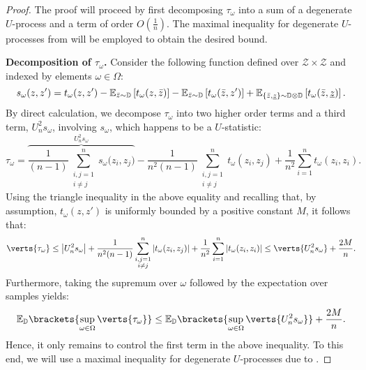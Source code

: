 \begin{proof}
The proof will proceed by first decomposing $\tau_{\omega}$ into  a sum of a degenerate $U$-process and a term of order $O(\frac{1}{n})$. The maximal inequality for degenerate $U$-processes from \cite{sherman1994maximal} will be employed to obtain the desired bound.

{\bf Decomposition of $\tau_{\omega}$.} 
Consider the following function  defined over $\mathcal{Z}\times \mathcal{Z}$ and indexed by elements $\omega\in \Omega$:
\begin{equation}\label{eq:def_degenerate_kernel}
    s_\omega(z,z')=t_\omega(z,z')-\mathbb{E}_{\bar{z}\sim\mathbb{D}}\left[t_\omega(z,\bar{z})\right]-\mathbb{E}_{\bar{z}\sim\mathbb{D}}\left[t_\omega(\bar{z},z')\right]+\mathbb{E}_{\{\bar{z},\underline{z}\}\sim\mathbb{D}\otimes\mathbb{D}}\left[t_\omega(\bar{z},\underline{z})\right]. 
\end{equation}
By direct calculation, we decompose $\tau_{\omega}$ into two higher order terms and a third  term, $U_n^2 s_{\omega}$, involving $s_{\omega}$, which happens to be a $U$-statistic: 
\begin{equation*}
    \tau_\omega= \overbrace{\frac{1}{(n-1)}\sum_{\substack{i,j=1\\i\neq j}}^n s_\omega\big(z_i,z_j\big)} ^{U_n^2 s_\omega}-\frac{1}{n^2(n-1)} \sum_{\substack{i,j=1\\i\neq j}}^n t_\omega(z_i,z_j)+\frac{1}{n^2}\sum_{i=1}^n t_\omega(z_i,z_i).
\end{equation*}
Using the triangle inequality in the above equality and recalling that, by assumption, $t_{\omega}(z,z')$ is uniformly bounded by a positive constant $M$, it follows that:
\begin{align*}
    \verts{\tau_\omega}\leq\left|U_{n}^2 s_\omega\right|+\frac{1}{n^2(n-1)}\sum_{\substack{i,j=1\\i\neq j}}^{n} \left|t_\omega(z_i,z_j)\right|+\frac{1}{n^2}\sum_{i=1}^{n}\left|t_\omega(z_i,z_i)\right|
    \leq 
     \verts{U_n^2 s_{\omega}} + \frac{2M}{n}.
\end{align*}
Furthermore, taking the supremum over $\omega$ followed by the expectation over samples yields: 
\begin{align}\label{eq:main_decomposition_u_stat}
	\mathbb{E}_{\PP}\brackets{\sup_{\omega\in \Omega} \verts{\tau_{\omega}}}\leq \mathbb{E}_{\PP}\brackets{\sup_{\omega\in \Omega} \verts{U_n^2 s_{\omega}}} + \frac{2M}{n}.
\end{align}
Hence, it only remains to control the first term in the above inequality. To this end, we will use a maximal inequality for degenerate $U$-processes due to \cite{sherman1994maximal}. 


\end{proof}
